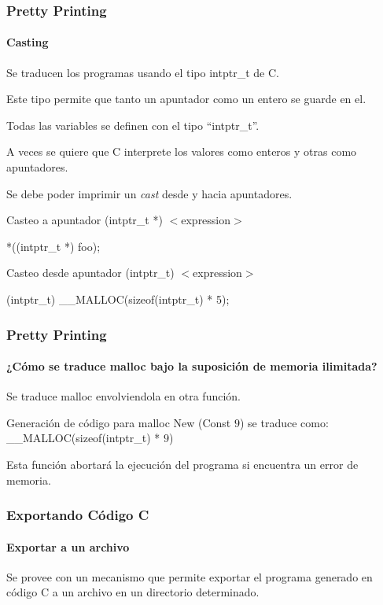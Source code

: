 \begin{frame}
\frametitle{Pretty Printing}
\framesubtitle{Casting}

Se traducen los programas usando el tipo intptr\_t de C.
\bigskip

Este tipo permite que tanto un apuntador como un entero se guarde en el.

Todas las variables se definen con el tipo ``intptr\_t''.

\bigskip

A veces se quiere que C interprete los valores como enteros y otras como apuntadores.

Se debe poder imprimir un \textit{cast} desde y hacia apuntadores.

\bigskip
\pause

\begin{block}{Casteo a apuntador}
(intptr\_t *) $<$expression$>$

*((intptr\_t *) foo);
\end{block}

\begin{block}{Casteo desde apuntador}
(intptr\_t) $<$expression$>$

(intptr\_t) \_\_MALLOC(sizeof(intptr\_t) * 5);
\end{block}


\end{frame}


\begin{frame}
\frametitle{Pretty Printing}
\framesubtitle{¿Cómo se traduce malloc bajo la suposición de memoria ilimitada?}

Se traduce malloc envolviendola en otra función.

\begin{block}{Generación de código para malloc}
New (Const $9$) se traduce como: \_\_MALLOC(sizeof(intptr\_t) * $9$)
\end{block}

\bigskip

Esta función abortará la ejecución del programa si encuentra un error de memoria.


\end{frame}


\begin{frame}
\frametitle{Exportando Código C}
\framesubtitle{Exportar a un archivo}

Se provee con un mecanismo que permite exportar el programa generado en código C a un archivo en un directorio determinado.


\end{frame}
